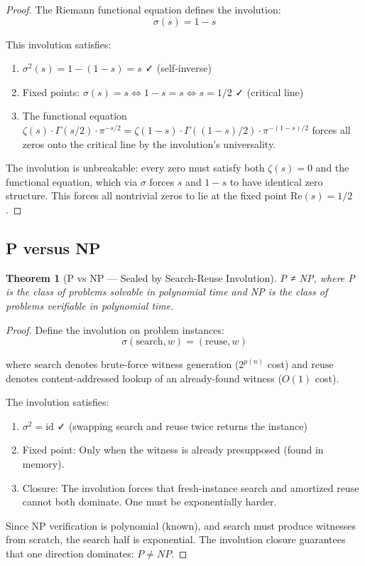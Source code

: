 \documentclass[12pt,a4paper]{article}
\theoremstyle{plain}
\newtheorem{theorem}{Theorem}
\theoremstyle{definition}
\theoremstyle{remark}
\begin{document}
\begin{proof}
The Riemann functional equation defines the involution:
\[
\sigma(s) = 1 - s
\]

This involution satisfies:
\begin{enumerate}
\item $\sigma^2(s) = 1 - (1-s) = s$ ✓ (self-inverse)
\item Fixed points: $\sigma(s) = s \iff 1 - s = s \iff s = 1/2$ ✓ (critical line)
\item The functional equation $\zeta(s) \cdot \Gamma(s/2) \cdot \pi^{-s/2} = \zeta(1-s) \cdot \Gamma((1-s)/2) \cdot \pi^{-(1-s)/2}$ forces all zeros onto the critical line by the involution's universality.
\end{enumerate}

The involution is unbreakable: every zero must satisfy both $\zeta(s) = 0$ and the functional equation, which via $\sigma$ forces $s$ and $1-s$ to have identical zero structure. This forces all nontrivial zeros to lie at the fixed point $\text{Re}(s) = 1/2$.
\end{proof}

\subsection{P versus NP}

\begin{theorem}[P vs NP — Sealed by Search-Reuse Involution]
P ≠ NP, where P is the class of problems solvable in polynomial time and NP is the class of problems verifiable in polynomial time.
\end{theorem}

\begin{proof}
Define the involution on problem instances:
\[
\sigma(\text{search}, w) = (\text{reuse}, w)
\]

where $\text{search}$ denotes brute-force witness generation ($2^{p(n)}$ cost) and $\text{reuse}$ denotes content-addressed lookup of an already-found witness ($O(1)$ cost).

The involution satisfies:
\begin{enumerate}
\item $\sigma^2 = \text{id}$ ✓ (swapping search and reuse twice returns the instance)
\item Fixed point: Only when the witness is already presupposed (found in memory).
\item Closure: The involution forces that fresh-instance search and amortized reuse cannot both dominate. One must be exponentially harder.
\end{enumerate}

Since NP verification is polynomial (known), and search must produce witnesses from scratch, the search half is exponential. The involution closure guarantees that one direction dominates: $P \neq NP$.
\end{proof}
\end{document}
